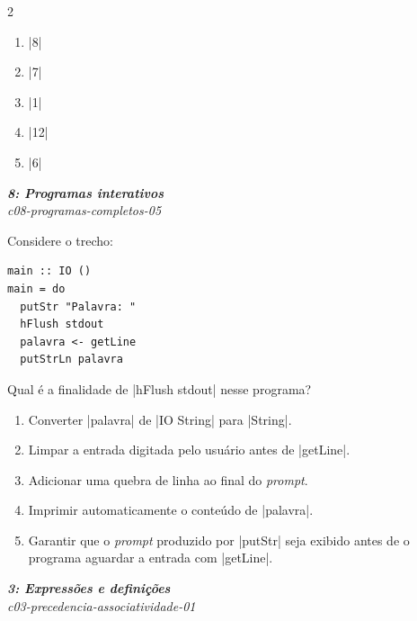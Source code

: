 \documentclass[a4paper,10pt,brazil]{article}
\begin{document}
\begin{multicols}{2}
\begin{enumerate}
  \item \haskellinline|8|

  \item \haskellinline|7|

  \item \haskellinline|1|

  \item \haskellinline|12|

  \item \haskellinline|6|


\end{enumerate}

\begin{flushright}
  \footnotesize
  \textit{\textbf{8: Programas interativos}}\\
  \textit{c08-programas-completos-05}\\

\end{flushright}
Considere o trecho:

\begin{verbatim}
main :: IO ()
main = do
  putStr "Palavra: "
  hFlush stdout
  palavra <- getLine
  putStrLn palavra
\end{verbatim}

Qual é a finalidade de \haskellinline|hFlush stdout| nesse programa?

\begin{enumerate}
  \item Converter \haskellinline|palavra| de \haskellinline|IO String| para \haskellinline|String|.

  \item Limpar a entrada digitada pelo usuário antes de \haskellinline|getLine|.

  \item Adicionar uma quebra de linha ao final do \emph{prompt}.

  \item Imprimir automaticamente o conteúdo de \haskellinline|palavra|.

  \item Garantir que o \emph{prompt} produzido por \haskellinline|putStr| seja exibido antes de o programa aguardar a entrada com \haskellinline|getLine|.


\end{enumerate}

\begin{flushright}
  \footnotesize
  \textit{\textbf{3: Expressões e definições}}\\
  \textit{c03-precedencia-associatividade-01}\\


\end{flushright}
\end{multicols}
\end{document}
